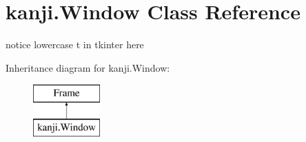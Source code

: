 \hypertarget{classkanji_1_1_window}{}\section{kanji.\+Window Class Reference}
\label{classkanji_1_1_window}


notice lowercase \textquotesingle{}t\textquotesingle{} in tkinter here  


Inheritance diagram for kanji.\+Window\+:\begin{figure}[H]
\begin{center}
\leavevmode
\includegraphics[height=2.000000cm]{classkanji_1_1_window}
\end{center}
\end{figure}
